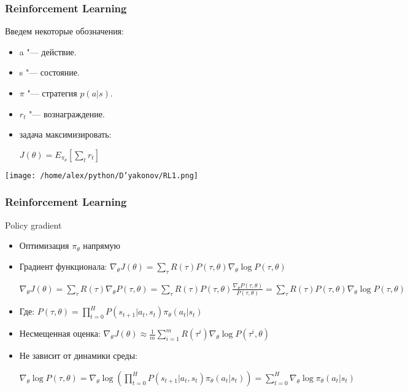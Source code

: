 \documentclass[fleqn, xcolor=x11names]{beamer}
\begin{document}
\begin{frame}[fragile]\frametitle{Reinforcement Learning}
\normalsize


\begin{minipage}[t]{.5\textwidth}
{\footnotesize
Введем некоторые обозначения:
\begin{itemize}
\item a "--- действие.
\item s "--- состояние.
\item $\pi$ "--- стратегия $p(a|s)$.
\item $r_{t}$ "--- вознаграждение.
\item задача максимизировать:
\begin{center}
$J(\theta) = E_{\pi_{\theta}} [\sum \limits_t r_t]$
\end{center}
\end{itemize}
}
\end{minipage}
\begin{minipage}[t]{.3\textwidth}
\begin{center}

\texttt{[image: /home/alex/python/D'yakonov/RL1.png]}


\end{center}
\end{minipage}\qquad
\end{frame}

\begin{frame}[fragile]\frametitle{Reinforcement Learning}
{\footnotesize
\begin{block}{Policy gradient}
\begin{itemize}
\item Оптимизация $\pi_{\theta}$ напрямую
\item Градиент функционала: $\nabla_{\theta}J(\theta) = \sum \limits_{\tau} R(\tau)P(\tau, \theta) \nabla_{\theta} \log P(\tau, \theta)$
\begin{center}
$\nabla_{\theta}J(\theta) = \sum \limits_{\tau} R(\tau) \nabla_{\theta}P(\tau, \theta) = \sum \limits_{\tau} R(\tau)P(\tau, \theta) \frac{\nabla_{\theta}P(\tau, \theta)}{P(\tau, \theta)} =  \sum \limits_{\tau} R(\tau)P(\tau, \theta) \nabla_{\theta} \log P(\tau, \theta) $
\end{center}
\item Где: $ P(\tau, \theta) = \prod \limits_{t=0}^{H} P(s_{t+1}|a_t,s_t) \pi_{\theta}(a_t|s_t)$

\item Несмещенная оценка: $\nabla_{\theta}J(\theta) \approx \frac{1}{m}\sum \limits_{i=1}^m R(\tau^i)\nabla_{\theta} \log P(\tau^i, \theta)$

\item Не зависит от динамики среды: 
\begin{center}
$\nabla_{\theta} \log P(\tau, \theta) = \nabla_{\theta} \log \left(\prod \limits_{t=0}^{H} P(s_{t+1}|a_t,s_t)\pi_{\theta}(a_t|s_t)\right) = \sum \limits_{t=0}^{H} \nabla_{\theta} \log \pi_{\theta}(a_t|s_t)$
\end{center}

\end{itemize}

\end{block}
}
\end{frame}
\end{document}
